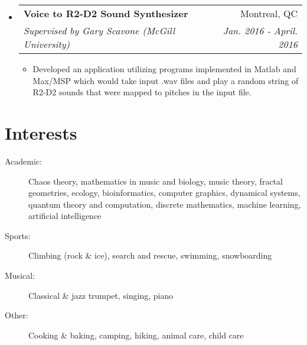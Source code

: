 \documentclass[letterpaper,11pt]{article}
\makeatletter
\newcommand{\resitem}[1]{\item #1 \vspace{-2pt}}
\newcommand{\ressubheading}[4]{
\begin{tabular*}{6.1in}{l@{\extracolsep{\fill}}r}
		\textbf{#1} & #2 \\
		\textit{#3} & \textit{#4} \\
\end{tabular*}\vspace{-1pt}}
\makeatother
\begin{document}
\begin{itemize}
\item
	\ressubheading{Voice to R2-D2 Sound Synthesizer}{Montreal, QC}{Supervised by Gary Scavone (McGill University)}{Jan. 2016 - April. 2016}
	\begin{itemize}
		\resitem{Developed an application utilizing programs implemented in Matlab and Max/MSP which would take input .wav files and play a random string of R2-D2 sounds that were mapped to pitches in the input file.}
	\end{itemize}

\end{itemize}

\section*{Interests}

\begin{description}
\item[Academic:] Chaos theory, mathematics in music and biology, music theory, fractal geometries, ecology, bioinformatics, computer graphics, dynamical systems, quantum theory and computation, discrete mathematics, machine learning, artificial intelligence

\item[Sports:] Climbing (rock \& ice), search and rescue, swimming, snowboarding

\item[Musical:] Classical \& jazz trumpet, singing, piano 

\item[Other:] Cooking \& baking, camping, hiking, animal care, child care
\end{description}
\end{document}
